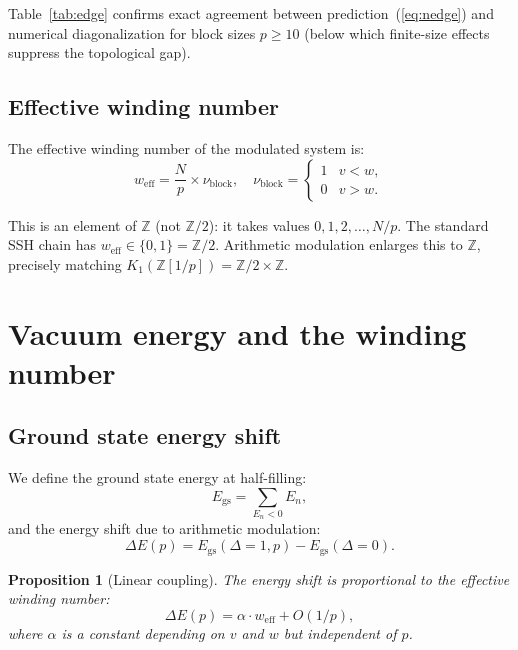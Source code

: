 \documentclass[11pt,a4paper]{article}
\newtheorem{proposition}[theorem]{Proposition}
\newcommand{\Zp}{\mathbb{Z}[1/p]}
\begin{document}
Table~\ref{tab:edge} confirms exact agreement between
prediction~(\ref{eq:nedge}) and numerical diagonalization
for block sizes $p \geq 10$ (below which finite-size effects
suppress the topological gap).

\subsection{Effective winding number}

The effective winding number of the modulated system is:
\begin{equation}
  w_{\mathrm{eff}} = \frac{N}{p} \times \nu_{\mathrm{block}},
  \quad \nu_{\mathrm{block}} = \begin{cases}
    1 & v < w, \\ 0 & v > w.
  \end{cases}
\end{equation}

This is an element of $\mathbb{Z}$ (not $\mathbb{Z}/2$):
it takes values $0, 1, 2, \ldots, N/p$.
The standard SSH chain has $w_{\mathrm{eff}} \in \{0, 1\}
= \mathbb{Z}/2$.
Arithmetic modulation enlarges this to $\mathbb{Z}$, precisely
matching $K_1(\Zp) = \mathbb{Z}/2 \times \mathbb{Z}$.

\section{Vacuum energy and the winding number}
\label{sec:energy}

\subsection{Ground state energy shift}

We define the ground state energy at half-filling:
\begin{equation}
  E_{\mathrm{gs}} = \sum_{E_n < 0} E_n,
\end{equation}
and the energy shift due to arithmetic modulation:
\begin{equation}
  \Delta E(p) = E_{\mathrm{gs}}(\Delta = 1, p) - E_{\mathrm{gs}}(\Delta = 0).
\end{equation}

\begin{proposition}[Linear coupling]
\label{prop:linear}
The energy shift is proportional to the effective winding number:
\begin{equation}
  \Delta E(p) = \alpha \cdot w_{\mathrm{eff}} + O(1/p),
  \label{eq:linear}
\end{equation}
where $\alpha$ is a constant depending on $v$ and $w$ but
independent of $p$.
\end{proposition}
\end{document}
